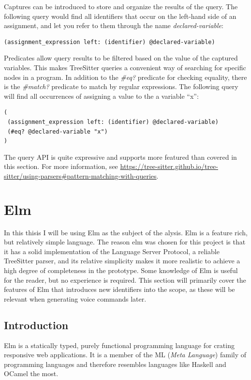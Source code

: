 \documentclass[../thesis.tex]{subfiles}
\begin{document}
Captures can be introduced to store and organize the results of the query.
The following query would find all identifiers that occur on the left-hand side of an assignment,
and let you refer to them through the name \textit{declared-variable}:
\begin{verbatim}
(assignment_expression left: (identifier) @declared-variable)
\end{verbatim}

Predicates allow query results to be filtered based on the value of the captured variables.
This makes TreeSitter queries a convenient way of searching for specific nodes in a program.
In addition to the \textit{\#eq?} predicate for checking equality, there is the \textit{\#match?} predicate
to match by regular expressions.
The following query will find all occurrences of assigning a value to the a variable ``x'':
\begin{Verbatim}
(
 (assignment_expression left: (identifier) @declared-variable)
 (#eq? @declared-variable "x")
)
\end{Verbatim}

The query API is quite expressive and supports more featured than covered in this section.
For more information, see 
\url{https://tree-sitter.github.io/tree-sitter/using-parsers#pattern-matching-with-queries}.



\section{Elm}\label{sec:elm}
In this thisis I will be using Elm as the subject of the alysis.
Elm is a feature rich, but relatively simple language.
The reason elm was chosen for this project is that it has a solid implementation of
the Language Server Protocol, a reliable TreeSitter parser, and its relative simplicity
makes it more realistic to achieve a high degree of completeness in the prototype.
Some knowledge of Elm is useful for the reader, but no experience is required.
This section will primarily cover the features of Elm that introduces new identifiers into the scope,
as these will be relevant when generating voice commands later.

\subsection{Introduction}
Elm is a statically typed, purely functional programming language for crating responsive web applications.
It is a member of the ML (\textit{Meta Language}) family of programming languages
and therefore resembles languages like Haskell and OCamel the most.
\end{document}
